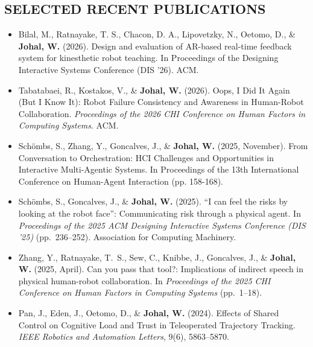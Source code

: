 
\subsection{SELECTED RECENT PUBLICATIONS}
\vspace{2pt}

{\small
\begin{itemize}[nosep]

    \item Bilal, M., Ratnayake, T. S., Chacon, D. A., Lipovetzky, N., Oetomo, D., \& \textbf{Johal, W.} (2026). Design and evaluation of AR-based real-time feedback system for kinesthetic robot teaching. In Proceedings of the Designing Interactive Systems Conference (DIS '26). ACM.  \faMedal

    \item Tabatabaei, R., Kostakos, V., \& \textbf{Johal, W.} (2026). Oops, I Did It Again (But I Know It): Robot Failure Consistency and Awareness in Human-Robot Collaboration. \textit{Proceedings of the 2026 CHI Conference on Human Factors in Computing Systems}. ACM. \faMedal

    
    \item Schömbs, S., Zhang, Y., Goncalves, J., \& \textbf{Johal, W.} (2025, November). From Conversation to Orchestration: HCI Challenges and Opportunities in Interactive Multi-Agentic Systems. In Proceedings of the 13th International Conference on Human-Agent Interaction (pp. 158-168).

    \item Schömbs, S., Goncalves, J., \& \textbf{Johal, W.} (2025). ``I can feel the risks by looking at the robot face'': Communicating risk through a physical agent. In \textit{Proceedings of the 2025 ACM Designing Interactive Systems Conference (DIS '25)} (pp.\ 236--252). Association for Computing Machinery.

    \item Zhang, Y., Ratnayake, T.\ S., Sew, C., Knibbe, J., Goncalves, J., \& \textbf{Johal, W.} (2025, April). Can you pass that tool?: Implications of indirect speech in physical human-robot collaboration. In \textit{Proceedings of the 2025 CHI Conference on Human Factors in Computing Systems} (pp.\ 1--18).

    \item Pan, J., Eden, J., Oetomo, D., \& \textbf{Johal, W.} (2024). Effects of Shared Control on Cognitive Load and Trust in Teleoperated Trajectory Tracking. \textit{IEEE Robotics and Automation Letters}, 9(6), 5863--5870.


\end{itemize}}
